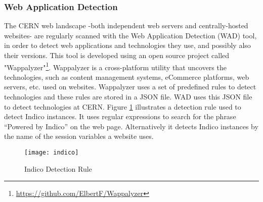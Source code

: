 \subsubsection{Web Application Detection}

The CERN web landscape -both independent web servers and centrally-hosted websites- are regularly scanned with the Web Application Detection (WAD) tool, in order to detect web applications and technologies they use, and possibly also their versions. This tool is developed using an open source project called "Wappalyzer"\footnote{\url{https://github.com/ElbertF/Wappalyzer}}. Wappalyzer is a cross-platform utility that uncovers the technologies, such as content management systems, eCommerce platforms, web servers, etc. used on websites.  Wappalyzer uses a set of predefined rules to detect technologies and these rules are stored in a JSON file. WAD uses this JSON file to detect technologies at CERN. Figure \ref{figure:indico} illustrates a detection rule used to detect Indico instances. It uses regular expressions to search for the phrase ``Powered by Indico'' on the web page. Alternatively it detects Indico instances by the name of the session variables a website uses.
\begin{figure}[h!]

  \centering
    \texttt{[image: indico]}
  \caption{Indico Detection Rule}
  \label{figure:indico}
\end{figure}
 
